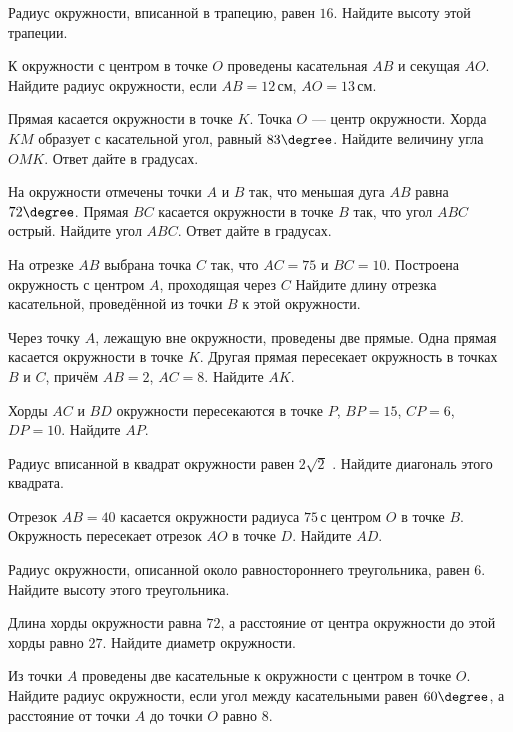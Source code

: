 \begin{class}[number=6]
	\begin{listofex}
		\item Радиус окружности, вписанной в трапецию, равен \( 16 \). Найдите высоту этой трапеции.
		\item К окружности с центром в точке \( O \) проведены касательная \( AB \) и секущая \( AO \). Найдите радиус окружности, если \( AB=12 \) см, \( AO=13 \) см.
		\item Прямая касается окружности в точке \( K \). Точка \( O \) --- центр окружности. Хорда \( KM \) образует с касательной угол, равный \( 83\degree \). Найдите величину угла \( OMK \). Ответ дайте в градусах.
		\item На окружности отмечены точки \( A \) и \( B \) так, что меньшая дуга \( AB \) равна \( 72\degree \). Прямая \( BC \) касается окружности в точке \( B \) так, что угол \( ABC \) острый. Найдите угол \( ABC \). Ответ дайте в градусах.
		\item На отрезке \( AB \) выбрана точка \( C \) так, что \( AC=75 \) и \( BC=10 \). Построена окружность с центром \( A \), проходящая через \( C \) Найдите длину отрезка касательной, проведённой из точки \( B \) к этой окружности.		
		\item Через точку \( A \), лежащую вне окружности, проведены две прямые. Одна прямая касается окружности в точке \( K \). Другая прямая пересекает окружность в точках \( B \) и \( C \), причём \( AB=2 \), \( AC=8 \). Найдите \( AK \).
		\item Хорды \( AC \) и \( BD \) окружности пересекаются в точке \( P \), \( BP=15 \), \( CP=6 \), \( DP=10 \). Найдите \( AP \).
		\item Радиус вписанной в квадрат окружности равен \( 2\sqrt{2} \) . Найдите диагональ этого квадрата.
		\item Отрезок \( AB=40 \) касается окружности радиуса \( 75 \) с центром \( O \) в точке \( B \). Окружность пересекает отрезок \( AO \) в точке \( D \). Найдите \( AD \).
		\item Радиус окружности, описанной около равностороннего треугольника, равен \( 6 \). Найдите высоту этого треугольника.
		\item Длина хорды окружности равна \( 72 \), а расстояние от центра окружности до этой хорды равно \( 27 \). Найдите диаметр окружности.
		\item Из точки \( A \) проведены две касательные к окружности с центром в точке \( O \). Найдите радиус окружности, если угол между касательными равен \( 60\degree \), а расстояние от точки \( A \) до точки \( O \) равно \( 8 \).

\end{listofex}
\end{class}

